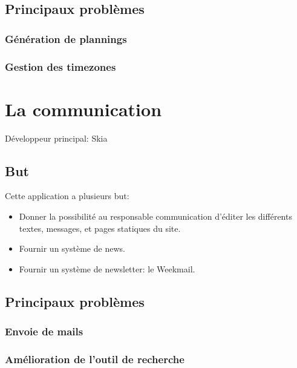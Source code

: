 \documentclass[a4paper]{report}
\begin{document}
\section{Principaux problèmes}
\label{sec:principaux_problemes}

\subsection{Génération de plannings}
\label{sub:generation_de_plannings}

\subsection{Gestion des timezones}
\label{sub:gestion_des_timezones}


\chapter{La communication}
\label{sec:la_communication}
\par Développeur principal: Skia

\section{But}
\label{sub:but}
\par Cette application a plusieurs but:
\begin{itemize}
    \item Donner la possibilité au responsable communication d'éditer les différents textes, messages, et pages
        statiques du site.
    \item Fournir un système de news.
    \item Fournir un système de newsletter: le Weekmail.
\end{itemize}

\section{Principaux problèmes}
\label{sec:principaux_problemes}

\subsection{Envoie de mails}
\label{sub:envoie_de_mails}

\subsection{Amélioration de l'outil de recherche}
\label{sub:amelioration_de_l_outil_de_recherche}
\end{document}
